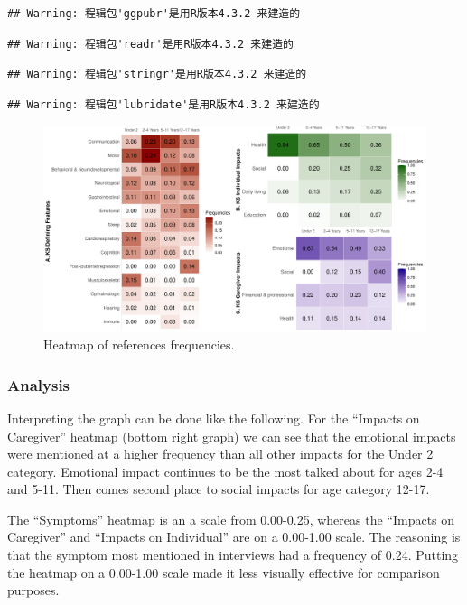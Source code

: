 \documentclass[
]{article}
\begin{document}
\begin{verbatim}
## Warning: 程辑包'ggpubr'是用R版本4.3.2 来建造的
\end{verbatim}

\begin{verbatim}
## Warning: 程辑包'readr'是用R版本4.3.2 来建造的
\end{verbatim}

\begin{verbatim}
## Warning: 程辑包'stringr'是用R版本4.3.2 来建造的
\end{verbatim}

\begin{verbatim}
## Warning: 程辑包'lubridate'是用R版本4.3.2 来建造的
\end{verbatim}

\begin{figure}
\centering
\includegraphics{Report_files/figure-latex/freq-plot-1.pdf}
\caption{\label{fig:freq-plot}Heatmap of references frequencies.}
\end{figure}

\hypertarget{analysis-1}{%
\subsubsection{Analysis}\label{analysis-1}}

Interpreting the graph can be done like the following. For the ``Impacts on Caregiver'' heatmap (bottom right graph) we can see that the emotional impacts were mentioned at a higher frequency than all other impacts for the Under 2 category. Emotional impact continues to be the most talked about for ages 2-4 and 5-11. Then comes second place to social impacts for age category 12-17.

The ``Symptoms'' heatmap is an a scale from 0.00-0.25, whereas the ``Impacts on Caregiver'' and ``Impacts on Individual'' are on a 0.00-1.00 scale. The reasoning is that the symptom most mentioned in interviews had a frequency of 0.24. Putting the heatmap on a 0.00-1.00 scale made it less visually effective for comparison purposes.
\end{document}

